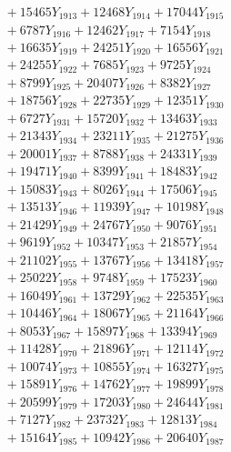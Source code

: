 \documentclass[a4paper,10pt]{article}
\begin{document}
{\begin{align}
&\;  + 15465 Y_{1913} + 12468 Y_{1914} + 17044 Y_{1915} \\[0.3ex]
&\;  + 6787 Y_{1916} + 12462 Y_{1917} + 7154 Y_{1918} \\[0.5ex]\allowbreak
&\;  + 16635 Y_{1919} + 24251 Y_{1920} + 16556 Y_{1921} \\[0.3ex]
&\;  + 24255 Y_{1922} + 7685 Y_{1923} + 9725 Y_{1924} \\[0.3ex]
&\;  + 8799 Y_{1925} + 20407 Y_{1926} + 8382 Y_{1927} \\[0.3ex]
&\;  + 18756 Y_{1928} + 22735 Y_{1929} + 12351 Y_{1930} \\[0.3ex]
&\;  + 6727 Y_{1931} + 15720 Y_{1932} + 13463 Y_{1933} \\[0.3ex]
&\;  + 21343 Y_{1934} + 23211 Y_{1935} + 21275 Y_{1936} \\[0.3ex]
&\;  + 20001 Y_{1937} + 8788 Y_{1938} + 24331 Y_{1939} \\[0.3ex]
&\;  + 19471 Y_{1940} + 8399 Y_{1941} + 18483 Y_{1942} \\[0.3ex]
&\;  + 15083 Y_{1943} + 8026 Y_{1944} + 17506 Y_{1945} \\[0.3ex]
&\;  + 13513 Y_{1946} + 11939 Y_{1947} + 10198 Y_{1948} \\[0.5ex]\allowbreak
&\;  + 21429 Y_{1949} + 24767 Y_{1950} + 9076 Y_{1951} \\[0.3ex]
&\;  + 9619 Y_{1952} + 10347 Y_{1953} + 21857 Y_{1954} \\[0.3ex]
&\;  + 21102 Y_{1955} + 13767 Y_{1956} + 13418 Y_{1957} \\[0.3ex]
&\;  + 25022 Y_{1958} + 9748 Y_{1959} + 17523 Y_{1960} \\[0.3ex]
&\;  + 16049 Y_{1961} + 13729 Y_{1962} + 22535 Y_{1963} \\[0.3ex]
&\;  + 10446 Y_{1964} + 18067 Y_{1965} + 21164 Y_{1966} \\[0.3ex]
&\;  + 8053 Y_{1967} + 15897 Y_{1968} + 13394 Y_{1969} \\[0.3ex]
&\;  + 11428 Y_{1970} + 21896 Y_{1971} + 12114 Y_{1972} \\[0.3ex]
&\;  + 10074 Y_{1973} + 10855 Y_{1974} + 16327 Y_{1975} \\[0.3ex]
&\;  + 15891 Y_{1976} + 14762 Y_{1977} + 19899 Y_{1978} \\[0.5ex]\allowbreak
&\;  + 20599 Y_{1979} + 17203 Y_{1980} + 24644 Y_{1981} \\[0.3ex]
&\;  + 7127 Y_{1982} + 23732 Y_{1983} + 12813 Y_{1984} \\[0.3ex]
&\;  + 15164 Y_{1985} + 10942 Y_{1986} + 20640 Y_{1987} \\[0.3ex]

\end{align}}
\end{document}
